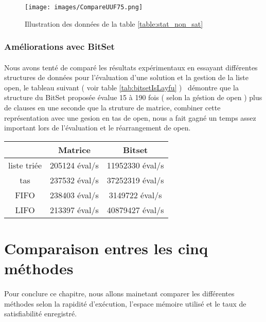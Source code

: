 \begin{figure}[H]
	\texttt{[image: images/CompareUUF75.png]}
	\caption{Illustration des données de la table \ref{table:stat_non_sat}}
\end{figure}

\subsubsection{Améliorations avec BitSet}
\paragraph{}
Nous avons tenté de comparé les résultats expérimentaux en essayant différentes structures de données pour l'évaluation d'une solution et la gestion de la liste open, le tableau suivant ( voir table \ref{tab:bitsetIsLayfu} )  \ démontre que la structure du BitSet proposée évalue 15 à 190 fois ( selon la géstion de open ) plus de clauses en une seconde que la struture de matrice, combiner cette représentation avec une gesion en tas de open, nous a fait gagné un temps assez important lors de l'évaluation et le réarrangement de open.
\begin{center}\label{tab:bitsetIsLayfu}
	\begin{tabular}{|c | c| c|}
		\hline
		\backslashbox{gestion de open}{évaluation par}& Matrice & Bitset\\\hline
		liste triée& 205124 éval/s& 11952330 éval/s\\\hline
		tas & 237532 éval/s & 37252319 éval/s\\\hline
		FIFO & 238403 éval/s & 3149722 éval/s\\\hline
		LIFO & 213397 éval/s& 40879427 éval/s\\\hline
		\end{tabular}
\end{center}
		
		
		
\section{Comparaison entres les cinq méthodes}
\paragraph{}
Pour conclure ce chapitre, nous allons mainetant comparer les différentes méthodes selon la rapidité d'exécution, l'espace mémoire utilisé et le taux de satisfiabilité enregistré.
